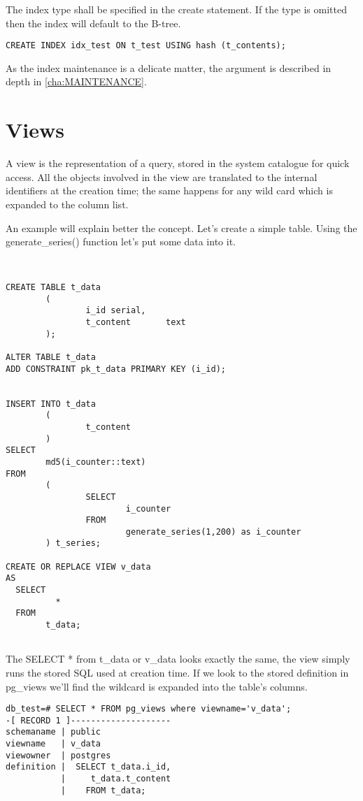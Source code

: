 The index type shall be specified in the create statement. If the type is 
omitted then the index will default to the B-tree.

\begin{lstlisting}[style=pgsql]
 CREATE INDEX idx_test ON t_test USING hash (t_contents);
\end{lstlisting}


As the index maintenance is a delicate matter, the argument is described in 
depth in \ref{cha:MAINTENANCE}.


\section{Views}
\label{sec:VIEWS}
A view is the representation of a query, stored in the system catalogue 
for quick access. All the objects involved in the view are translated to the 
internal identifiers at the creation time; the same happens for any wild card 
which is expanded to the column list.

An example will explain better the concept. Let's create a simple table. Using 
the generate\_series() function let's put some data into it.

\begin{lstlisting}[style=pgsql]


CREATE TABLE t_data 
        ( 
                i_id serial,
                t_content       text
        );

ALTER TABLE t_data 
ADD CONSTRAINT pk_t_data PRIMARY KEY (i_id);


INSERT INTO t_data
        (
                t_content
        )
SELECT
        md5(i_counter::text)
FROM
        (
                SELECT
                        i_counter
                FROM
                        generate_series(1,200) as i_counter
        ) t_series;

CREATE OR REPLACE VIEW v_data 
AS 
  SELECT 
          *
  FROM 
        t_data;


\end{lstlisting}

The SELECT * from t\_data or v\_data looks exactly the same, the view 
simply runs the stored SQL used at creation time.
If we look to the stored definition in pg\_views we'll find the wildcard is 
expanded into the table's columns.


\begin{lstlisting}[style=pgsql]
 db_test=# SELECT * FROM pg_views where viewname='v_data';
-[ RECORD 1 ]--------------------
schemaname | public
viewname   | v_data
viewowner  | postgres
definition |  SELECT t_data.i_id,
           |     t_data.t_content
           |    FROM t_data;


\end{lstlisting}

